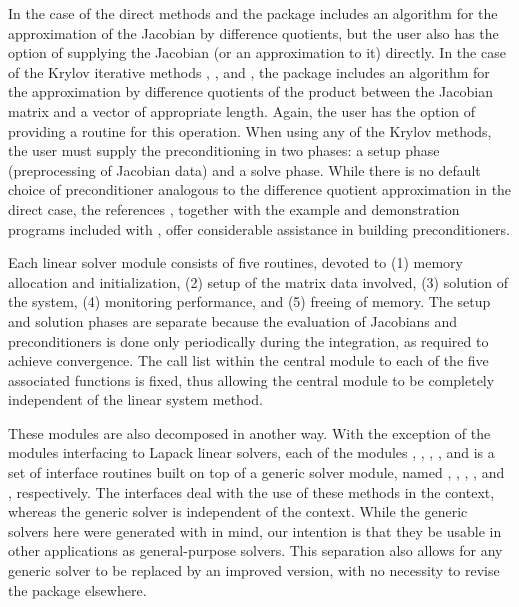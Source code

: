 In the case of the direct methods {\idadense} and {\idaband}
the package includes an algorithm for the approximation of the Jacobian by difference
quotients, but the user also has the option of supplying the Jacobian
(or an approximation to it) directly. In the case of the Krylov iterative methods
{\idaspgmr}, {\idaspbcg}, and {\idasptfqmr}, the package includes an algorithm for
the approximation by difference quotients of the product between the Jacobian matrix
and a vector of appropriate length. Again, the user has the option of providing
a routine for this operation.
When  using any of the Krylov
methods, the user must supply the preconditioning in two phases: 
a setup phase (preprocessing of Jacobian data) and a solve phase.
While there is no default
choice of preconditioner analogous to the difference quotient
approximation in the direct case, the references
\cite{BrHi:89, Byr:92}, together with
the example and demonstration programs included with {\idas}, offer
considerable assistance in building preconditioners.

Each {\idas} linear solver module consists of five routines, devoted to
(1) memory allocation and initialization, (2) setup of the matrix data
involved, (3) solution of the system, (4) monitoring performance,
and (5) freeing of memory.  
The setup and solution phases are separate because the evaluation of
Jacobians and preconditioners is done only periodically during the
integration, as required to achieve convergence. The call list within
the central {\idas} module to each of the five associated functions is
fixed, thus allowing the central module to be completely independent
of the linear system method.

These modules are also decomposed in another way.
With the exception of the modules interfacing to Lapack linear solvers,
each of the modules {\idadense}, {\idaband}, {\idaspgmr}, {\idaspbcg}, and {\idasptfqmr}
is a set of interface routines built on top of a generic solver module, 
named {\dense}, {\band}, {\spgmr}, {\spbcg}, and {\sptfqmr}, respectively.  
The interfaces deal with the use of these methods in the {\idas} context, 
whereas the generic solver is independent of the context.
While the generic solvers here were generated with {\sundials} in mind, our
intention is that they be usable in other applications as
general-purpose solvers.  This separation also allows for any generic
solver to be replaced by an improved version, with no necessity to
revise the {\idas} package elsewhere.

